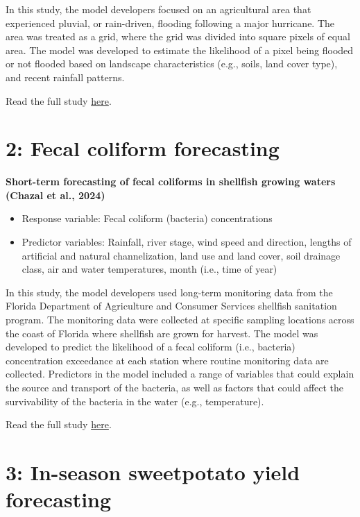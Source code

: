 \documentclass[
]{book}
\providecommand{\tightlist}{%
  \setlength{\itemsep}{0pt}\setlength{\parskip}{0pt}}
\begin{document}
In this study, the model developers focused on an agricultural area that experienced pluvial, or rain-driven, flooding following a major hurricane. The area was treated as a grid, where the grid was divided into square pixels of equal area. The model was developed to estimate the likelihood of a pixel being flooded or not flooded based on landscape characteristics (e.g., soils, land cover type), and recent rainfall patterns.

Read the full study \href{https://www.sciencedirect.com/science/article/pii/S1364815223001445?dgcid=author}{here}.

\hypertarget{fecal-coliform-forecasting}{%
\section{2: Fecal coliform forecasting}\label{fecal-coliform-forecasting}}

\textbf{Short-term forecasting of fecal coliforms in shellfish growing waters (Chazal et al., 2024)}

\begin{itemize}
\tightlist
\item
  Response variable: Fecal coliform (bacteria) concentrations
\item
  Predictor variables: Rainfall, river stage, wind speed and direction, lengths of artificial and natural channelization, land use and land cover, soil drainage class, air and water temperatures, month (i.e., time of year)
\end{itemize}

In this study, the model developers used long-term monitoring data from the Florida Department of Agriculture and Consumer Services shellfish sanitation program. The monitoring data were collected at specific sampling locations across the coast of Florida where shellfish are grown for harvest. The model was developed to predict the likelihood of a fecal coliform (i.e., bacteria) concentration exceedance at each station where routine monitoring data are collected. Predictors in the model included a range of variables that could explain the source and transport of the bacteria, as well as factors that could affect the survivability of the bacteria in the water (e.g., temperature).

Read the full study \href{https://doi.org/10.1016/j.marpolbul.2024.116053}{here}.

\hypertarget{in-season-sweetpotato-yield-forecasting}{%
\section{3: In-season sweetpotato yield forecasting}\label{in-season-sweetpotato-yield-forecasting}}
\end{document}
